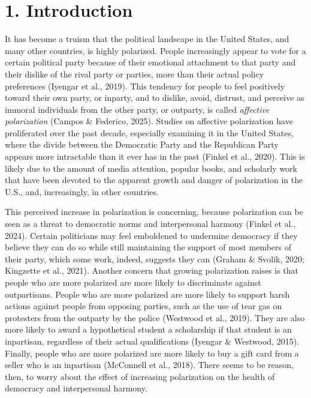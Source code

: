 \documentclass[authordate, meta]{jote-new-article}
\author[1]{\mbox{Lukas Sotola\orcid{0000-0001-8120-394X}}}
\affil[1]{Department of Psychology, Pace University, Pleasantville, United States}
\begin{document}
\begin{frontmatter}
  \maketitle
  \begin{abstract}
    \printabstracttext
  \end{abstract}
\end{frontmatter}


	\section{1. Introduction}



	It has become a truism that the political landscape in the United States, and many other countries, is highly polarized. People increasingly appear to vote for a certain political party because of their emotional attachment to that party and their dislike of the rival party or parties, more than their actual policy preferences (Iyengar et al., 2019). This tendency for people to feel positively toward their own party, or inparty, and to dislike, avoid, distrust, and perceive as immoral individuals from the other party, or outparty, is called \emph{affective polarization }(Campos \& Federico, 2025). Studies on affective polarization have proliferated over the past decade, especially examining it in the United States, where the divide between the Democratic Party and the Republican Party appears more intractable than it ever has in the past (Finkel et al., 2020). This is likely due to the amount of media attention, popular books, and scholarly work that have been devoted to the apparent growth and danger of polarization in the U.S., and, increasingly, in other countries.



	This perceived increase in polarization is concerning, because polarization can be seen as a threat to democratic norms and interpersonal harmony (Finkel et al., 2024). Certain politicians may feel emboldened to undermine democracy if they believe they can do so while still maintaining the support of most members of their party, which some work, indeed, suggests they can (Graham \& Svolik, 2020; Kingzette et al., 2021). Another concern that growing polarization raises is that people who are more polarized are more likely to discriminate against outpartisans. People who are more polarized are more likely to support harsh actions against people from opposing parties, such as the use of tear gas on protesters from the outparty by the police (Westwood et al., 2019). They are also more likely to award a hypothetical student a scholarship if that student is an inpartisan, regardless of their actual qualifications (Iyengar \& Westwood, 2015). Finally, people who are more polarized are more likely to buy a gift card from a seller who is an inpartisan (McConnell et al., 2018). There seems to be reason, then, to worry about the effect of increasing polarization on the health of democracy and interpersonal harmony.
\end{document}
